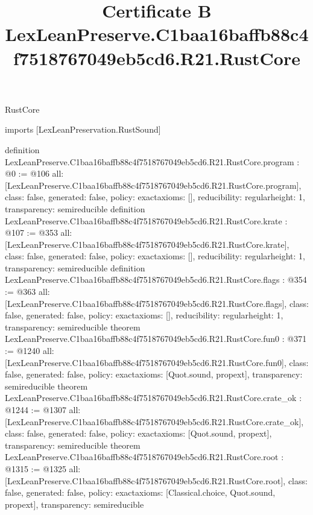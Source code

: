 \begin{lexlean}{RustCore}
\title{Certificate B LexLeanPreserve.C1baa16baffb88c4f7518767049eb5cd6.R21.RustCore}
\begin{coremodule}
imports [LexLeanPreservation.RustSound]

definition LexLeanPreserve.C1baa16baffb88c4f7518767049eb5cd6.R21.RustCore.program : @0 := @106 {
  all: [LexLeanPreserve.C1baa16baffb88c4f7518767049eb5cd6.R21.RustCore.program],
  class: false,
  generated: false,
  policy: exact{axioms: []},
  reducibility: regular{height: 1},
  transparency: semireducible
}
definition LexLeanPreserve.C1baa16baffb88c4f7518767049eb5cd6.R21.RustCore.krate : @107 := @353 {
  all: [LexLeanPreserve.C1baa16baffb88c4f7518767049eb5cd6.R21.RustCore.krate],
  class: false,
  generated: false,
  policy: exact{axioms: []},
  reducibility: regular{height: 1},
  transparency: semireducible
}
definition LexLeanPreserve.C1baa16baffb88c4f7518767049eb5cd6.R21.RustCore.flags : @354 := @363 {
  all: [LexLeanPreserve.C1baa16baffb88c4f7518767049eb5cd6.R21.RustCore.flags],
  class: false,
  generated: false,
  policy: exact{axioms: []},
  reducibility: regular{height: 1},
  transparency: semireducible
}
theorem LexLeanPreserve.C1baa16baffb88c4f7518767049eb5cd6.R21.RustCore.fun0 : @371 := @1240 {
  all: [LexLeanPreserve.C1baa16baffb88c4f7518767049eb5cd6.R21.RustCore.fun0],
  class: false,
  generated: false,
  policy: exact{axioms: [Quot.sound, propext]},
  transparency: semireducible
}
theorem LexLeanPreserve.C1baa16baffb88c4f7518767049eb5cd6.R21.RustCore.crate_ok : @1244 := @1307 {
  all: [LexLeanPreserve.C1baa16baffb88c4f7518767049eb5cd6.R21.RustCore.crate_ok],
  class: false,
  generated: false,
  policy: exact{axioms: [Quot.sound, propext]},
  transparency: semireducible
}
theorem LexLeanPreserve.C1baa16baffb88c4f7518767049eb5cd6.R21.RustCore.root : @1315 := @1325 {
  all: [LexLeanPreserve.C1baa16baffb88c4f7518767049eb5cd6.R21.RustCore.root],
  class: false,
  generated: false,
  policy: exact{axioms: [Classical.choice, Quot.sound, propext]},
  transparency: semireducible
}


\end{coremodule}
\end{lexlean}
